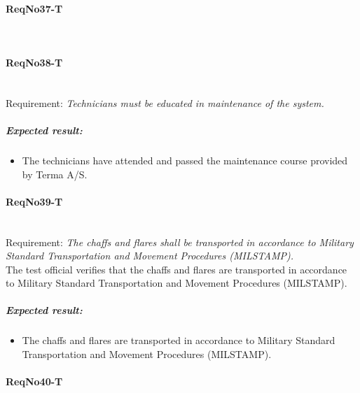 \paragraph{ReqNo37-T}\mbox{}\\ %


\paragraph{ReqNo38-T}\mbox{}\\ %
Requirement: \textit{Technicians must be educated in maintenance of the system.}\\

\subparagraph{Expected result:}
	\begin{itemize}
	\item The technicians have attended and passed the maintenance course provided by Terma A/S.
	\end{itemize}

\paragraph{ReqNo39-T}\mbox{}\\ %
Requirement: \textit{The chaffs and flares shall be transported in accordance to Military Standard Transportation and Movement Procedures (MILSTAMP).}\\

The test official verifies that the chaffs and flares are transported in accordance to Military Standard Transportation and Movement Procedures (MILSTAMP).

\subparagraph{Expected result:}
	\begin{itemize}
	\item The chaffs and flares are transported in accordance to Military Standard Transportation and Movement Procedures (MILSTAMP).
	\end{itemize}

\paragraph{ReqNo40-T}\mbox{}\\ %